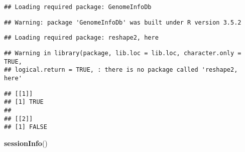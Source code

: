 \documentclass[]{article}
\newenvironment{Shaded}{\begin{snugshade}}{\end{snugshade}}
\newcommand{\KeywordTok}[1]{\textcolor[rgb]{0.13,0.29,0.53}{\textbf{#1}}}
\newcommand{\NormalTok}[1]{#1}
\begin{document}
\begin{verbatim}
## Loading required package: GenomeInfoDb
\end{verbatim}

\begin{verbatim}
## Warning: package 'GenomeInfoDb' was built under R version 3.5.2
\end{verbatim}

\begin{verbatim}
## Loading required package: reshape2, here
\end{verbatim}

\begin{verbatim}
## Warning in library(package, lib.loc = lib.loc, character.only = TRUE,
## logical.return = TRUE, : there is no package called 'reshape2, here'
\end{verbatim}

\begin{verbatim}
## [[1]]
## [1] TRUE
## 
## [[2]]
## [1] FALSE
\end{verbatim}

\begin{Shaded}
\begin{Highlighting}[]
\KeywordTok{sessionInfo}\NormalTok{()}
\end{Highlighting}
\end{Shaded}
\end{document}

